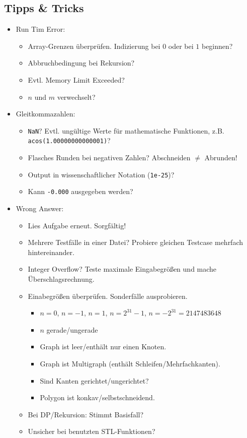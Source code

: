 \subsection{Tipps \& Tricks}

\begin{itemize}
	\item Run Tim Error:
	\begin{itemize}
		\item Array-Grenzen überprüfen. Indizierung bei $0$ oder bei $1$ beginnen?
		\item Abbruchbedingung bei Rekursion?
		\item Evtl. Memory Limit Exceeded?
		\item $n$ und $m$ verwechselt?
	\end{itemize}

	\item Gleitkommazahlen:
	\begin{itemize}
		\item \lstinline{NaN}? Evtl. ungültige Werte für mathematische Funktionen, z.B. \lstinline{acos(1.00000000000001)}?
		\item Flasches Runden bei negativen Zahlen? Abschneiden $\neq$ Abrunden!
		\item Output in wissenschaftlicher Notation (\lstinline{1e-25})?
		\item Kann \lstinline{-0.000} ausgegeben werden?
	\end{itemize}

	\item Wrong Answer:
	\begin{itemize}
		\item Lies Aufgabe erneut. Sorgfältig!
		\item Mehrere Testfälle in einer Datei? Probiere gleichen Testcase mehrfach hintereinander.
		\item Integer Overflow? Teste maximale Eingabegrößen und mache Überschlagsrechnung.
		\item Einabegrößen überprüfen. Sonderfälle ausprobieren.
		\begin{itemize}
			\item $n = 0$, $n = -1$, $n = 1$, $n = 2^{31}-1$, $n = -2^{31} = 2147483648$
			\item $n$ gerade/ungerade
			\item Graph ist leer/enthält nur einen Knoten.
			\item Graph ist Multigraph (enthält Schleifen/Mehrfachkanten).
			\item Sind Kanten gerichtet/ungerichtet?
			\item Polygon ist konkav/selbstschneidend.
		\end{itemize}
		\item Bei DP/Rekursion: Stimmt Basisfall?
		\item Unsicher bei benutzten STL-Funktionen?
	\end{itemize}
\end{itemize}

